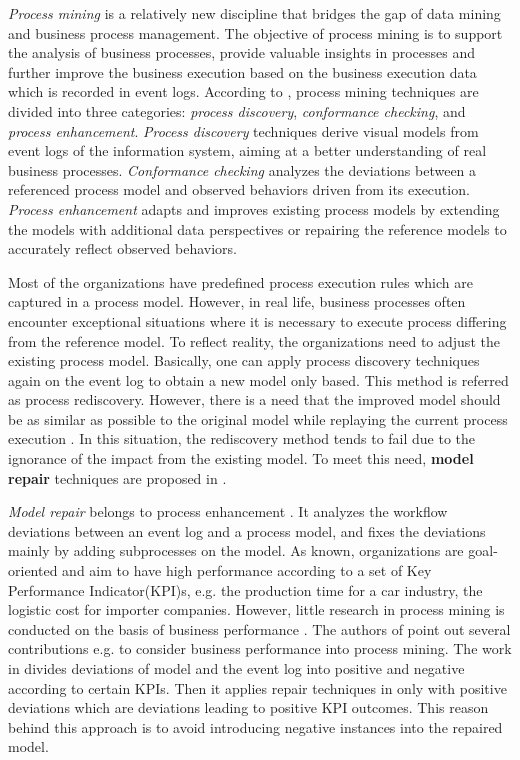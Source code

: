 %
\emph{Process mining} is a relatively new discipline that bridges the gap of data mining and business process management. The objective of process mining is to support the analysis of business processes, provide valuable insights in processes and further improve the business execution based on the business execution data which is recorded in event logs. According to  \cite{van2011process}, process mining techniques are divided into three categories: \emph{process discovery}, \emph{conformance checking}, and \emph{process enhancement}. \emph{Process discovery} techniques derive visual models from event logs of the information system, aiming at a better understanding of real business processes. \emph{Conformance checking} analyzes the deviations between a referenced process model and observed behaviors driven from its execution. \emph{Process enhancement} adapts and improves existing process models by extending the models with additional data perspectives or repairing the reference models to accurately reflect observed behaviors. 

Most of the organizations have predefined process execution rules which are captured in a process model. However, in real life, business processes often encounter exceptional situations where it is necessary to execute process differing from the reference model. To reflect reality, the organizations need to adjust the existing process model. Basically, one can apply process discovery techniques again  on the event log to obtain a new model only based. This method is referred as process rediscovery. However, there is a need that the improved model should be as similar as possible to the original model while replaying the current process execution \cite{fahland2012repairing}. In this situation, the rediscovery method tends to fail due to the ignorance of the impact from the existing model. To meet this need, \textbf{model repair} techniques are proposed in  \cite{fahland2012repairing}.

\emph{Model repair} belongs to process enhancement \cite{fahland2012repairing}. It analyzes the workflow deviations between an event log and a process model, and fixes the deviations mainly by adding subprocesses on the model. As known, organizations are goal-oriented and aim to have high performance according to a set of Key Performance Indicator(KPI)s, e.g. the production time for a car industry, the logistic cost for importer companies.  However, little research in process mining is conducted on the basis of business performance \cite{ghasemi2019event}.  The authors of  \cite{ghasemi2019event} point out several contributions e.g.   \cite{dees2017enhancing} to consider business performance into process mining. The work in  \cite{dees2017enhancing} divides deviations of model and the event log into positive and negative according to certain KPIs. Then it applies repair techniques in  \cite{fahland2012repairing} only with positive deviations which are deviations leading to positive KPI outcomes. This reason behind this approach  is to avoid introducing negative instances into the repaired model. 

